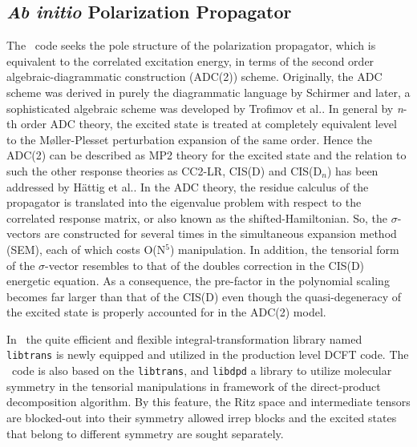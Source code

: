 \subsection{\textit{Ab initio} Polarization Propagator} \label{adc}

The \PSIadc\ code seeks the pole structure of the polarization propagator, which is equivalent to the correlated excitation energy, in terms of the second order algebraic-diagrammatic construction (ADC(2)) scheme. Originally, the ADC scheme was derived in purely the diagrammatic language by Schirmer\cite{Schirmer:1982} and later, a sophisticated algebraic scheme was developed by Trofimov et al.\cite{Trofimov:2006}. In general by \textit{n}-th order ADC theory, the excited state is treated at completely equivalent level to the M\o ller-Plesset perturbation expansion of the same order. Hence the ADC(2) can be described as MP2 theory for the excited state and the relation to such the other response theories as CC2-LR, CIS(D) and CIS(D${}_n$) has been addressed by H\"attig et al.\cite{Haettig:2002}. In the ADC theory, the residue calculus of the propagator is translated into the eigenvalue problem with respect to the correlated response matrix, or also known as the shifted-Hamiltonian. So, the $\sigma$-vectors are constructed for several times in the simultaneous expansion method (SEM), each of which costs O(N${}^5$) manipulation. In addition, the tensorial form of the $\sigma$-vector resembles to that of the doubles correction in the CIS(D) energetic equation. As a consequence, the pre-factor in the polynomial scaling becomes far larger than that of the CIS(D) even though the quasi-degeneracy of the excited state is properly accounted for in the ADC(2) model.

In \PSIfour\ the quite efficient and flexible integral-transformation library named {\tt libtrans} is newly equipped and utilized in the production level DCFT code. The \PSIadc\ code is also based on the {\tt libtrans}, and {\tt libdpd} a library to utilize molecular symmetry in the tensorial manipulations in framework of the direct-product decomposition algorithm. By this feature, the Ritz space and intermediate tensors are blocked-out into their symmetry allowed irrep blocks and the excited states that belong to different symmetry are sought separately.

